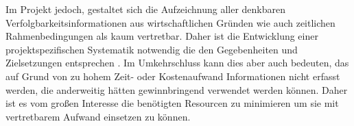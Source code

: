Im Projekt jedoch, gestaltet sich die Aufzeichnung aller denkbaren Verfolgbarkeitsinformationen aus wirtschaftlichen Gründen wie auch zeitlichen Rahmenbedingungen als kaum vertretbar. Daher ist die Entwicklung einer projektspezifischen Systematik notwendig die den Gegebenheiten und Zielsetzungen entsprechen \cite{Pohl2008RequirementsTechniken}. Im Umkehrschluss kann dies aber auch bedeuten, das auf Grund von zu hohem Zeit- oder Kostenaufwand Informationen nicht erfasst werden, die anderweitig hätten gewinnbringend verwendet werden können. Daher ist es vom großen Interesse die benötigten Resourcen zu minimieren um sie mit vertretbarem Aufwand einsetzen zu können.



